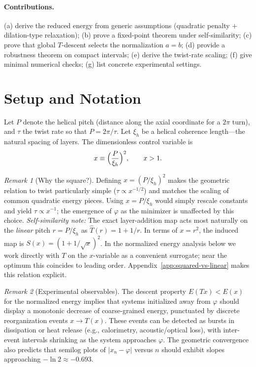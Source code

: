 \documentclass[11pt]{article}
\theoremstyle{remark}
\newtheorem{remark}{Remark}
\theoremstyle{definition}
\newcommand{\ph}{\varphi}
\begin{document}
\paragraph{Contributions.} (a) derive the reduced energy from generic assumptions (quadratic penalty $+$ dilation-type relaxation); (b) prove a fixed-point theorem under self-similarity; (c) prove that global $T$-descent selects the normalization $a=b$; (d) provide a robustness theorem on compact intervals; (e) derive the twist-rate scaling; (f) give minimal numerical checks; (g) list concrete experimental settings.

\section{Setup and Notation}
Let $P$ denote the helical pitch (distance along the axial coordinate for a $2\pi$ turn), and $\tau$ the twist rate so that $P=2\pi/\tau$. Let $\xi_h$ be a helical coherence length---the natural spacing of layers. The dimensionless control variable is
\begin{equation}
 x \equiv \Bigl(\frac{P}{\xi_h}\Bigr)^2, \qquad x>1.
 \label{eq:defx}
\end{equation}
\begin{remark}[Why the square?]
Defining $x=(P/\xi_h)^2$ makes the geometric relation to twist particularly simple ($\tau\propto x^{-1/2}$) and matches the scaling of common quadratic energy pieces. Using $x=P/\xi_h$ would simply rescale constants and yield $\tau\propto x^{-1}$; the emergence of $\ph$ as the minimizer is unaffected by this choice. \emph{Self-similarity note:} The exact layer-addition map acts most naturally on the \emph{linear} pitch $r=P/\xi_h$ as $\widehat T(r)=1+1/r$. In terms of $x=r^2$, the induced map is $S(x)=(1+1/\sqrt{x})^2$. In the normalized energy analysis below we work directly with $T$ on the $x$-variable as a convenient surrogate; near the optimum this coincides to leading order. Appendix~\ref{app:squared-vs-linear} makes this relation explicit.
\end{remark}
\begin{remark}[Experimental observables]
The descent property $E(Tx)<E(x)$ for the normalized energy implies that systems initialized away from $\varphi$ should display a monotonic decrease
of coarse-grained energy, punctuated by discrete reorganization events $x\!\to\!T(x)$. These events can be detected as
bursts in dissipation or heat release (e.g., calorimetry, acoustic/optical loss), with inter-event intervals shrinking as the system approaches $\varphi$.  The geometric convergence also predicts that semilog plots of $|x_n-\varphi|$ versus $n$ should exhibit slopes approaching $-\ln 2\approx -0.693$.
\end{remark}
\end{document}
